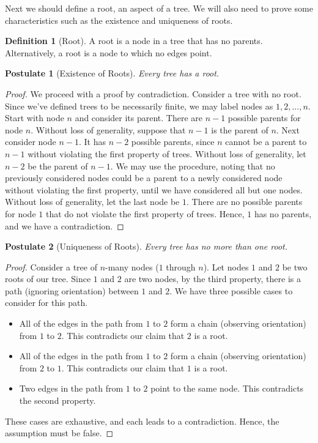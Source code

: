 \documentclass[12pt]{article}
\newtheorem{postulate}{Postulate}[section]
\theoremstyle{definition}
\newtheorem{definition}[theorem]{Definition}
\theoremstyle{remark}
\begin{document}
Next we should define a root, an aspect of a tree. We will also need to prove some characteristics such as the existence and uniqueness of roots.

\begin{definition}[Root]
A root is a node in a tree that has no parents. Alternatively, a root is a node to which no edges point.
\end{definition}

\begin{postulate}[Existence of Roots]
Every tree has a root.
\end{postulate}

\begin{proof}
We proceed with a proof by contradiction. Consider a tree with no root. Since we've defined trees to be necessarily finite, we may label nodes as $1 , 2 , ... , n$. Start with node $n$ and consider its parent. There are $n-1$ possible parents for node $n$. Without loss of generality, suppose that
$n-1$ is the parent of $n$. Next consider node $n-1$. It has $n-2$ possible parents, since $n$ cannot be a parent to $n-1$ without violating the first property of trees. Without loss of generality, let $n-2$ be the parent of $n-1$. We may use the procedure, noting that no previously considered nodes
could be a parent to a newly considered node without violating the first property, until we have considered all but one nodes. Without loss of generality, let the last node be $1$. There are no possible parents for node $1$ that do not violate the first property of trees. Hence, $1$ has no parents, and
we have a contradiction.
\end{proof}

\begin{postulate}[Uniqueness of Roots]
Every tree has no more than one root.
\end{postulate}

\begin{proof}
Consider a tree of $n$-many nodes ($1$ through $n$). Let nodes $1$ and $2$ be two roots of our tree. Since $1$ and $2$ are two nodes, by the third property, there is a path (ignoring orientation) between $1$ and $2$. We have three possible cases to consider for this path.
\begin{itemize}
	\item{All of the edges in the path from $1$ to $2$ form a chain (observing orientation) from $1$ to $2$. This contradicts our claim that $2$ is a root.}
	\item{All of the edges in the path from $1$ to $2$ form a chain (observing orientation) from $2$ to $1$. This contradicts our claim that $1$ is a root.}
	\item{Two edges in the path from $1$ to $2$ point to the same node. This contradicts the second property.}
\end{itemize}
These cases are exhaustive, and each leads to a contradiction. Hence, the assumption must be false.
\end{proof}
\end{document}

